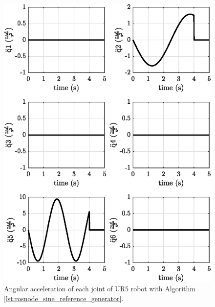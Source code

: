 \begin{figure}
    \centering
    \includegraphics{images/exp1.1/joint_acceleration.eps}
    \caption{Angular acceleration of each joint of UR5 robot with Algorithm \ref{lst:rosnode_sine_reference_generator}.}
    \label{fig:act1.1_joint_acceleration}
\end{figure}